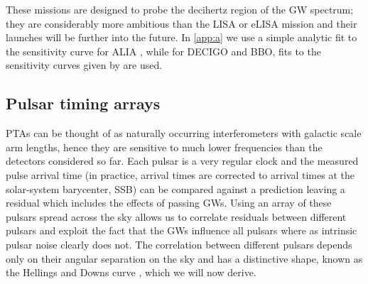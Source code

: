 These missions are designed to probe the decihertz region of the GW spectrum; they are considerably more ambitious than the LISA or eLISA mission and their launches will be further into the future. In \ref{app:a} we use a simple analytic fit to the sensitivity curve for ALIA , while for DECIGO and BBO, fits to the sensitivity curves given by \citet{2011PhRvD..83d4011Y} are used.



\subsection{Pulsar timing arrays}\label{sec:PTAgeneralproperties}
PTAs can be thought of as naturally occurring interferometers with galactic scale arm lengths, hence they are sensitive to much lower frequencies than the detectors considered so far. Each pulsar is a very regular clock and the measured pulse arrival time (in practice, arrival times are corrected to arrival times at the solar-system  barycenter, SSB) can be compared against a prediction leaving a residual which includes the effects of passing GWs. Using an array of these pulsars spread across the sky allows us to correlate residuals between different pulsars and exploit the fact that the GWs influence all pulsars where as intrinsic pulsar noise clearly does not. The correlation between different pulsars depends only on their angular separation on the sky and has a distinctive shape, known as the Hellings and Downs curve \citep{HellingsDowns}, which we will now derive.

